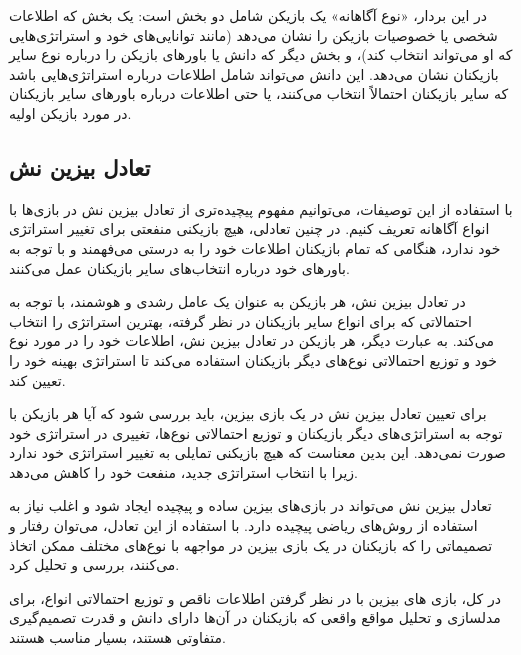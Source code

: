 در این بردار، «نوع آگاهانه» یک بازیکن شامل دو بخش است: یک بخش که اطلاعات شخصی یا خصوصیات بازیکن را نشان می‌دهد (مانند توانایی‌های خود و استراتژی‌هایی که او می‌تواند انتخاب کند)، و بخش دیگر که دانش یا باورهای بازیکن را درباره نوع سایر بازیکنان نشان می‌دهد. این دانش می‌تواند شامل اطلاعات درباره استراتژی‌هایی باشد که سایر بازیکنان احتمالاً انتخاب می‌کنند، یا حتی اطلاعات درباره باورهای سایر بازیکنان در مورد بازیکن اولیه.

\subsection*{تعادل بیزین نش}

با استفاده از این توصیفات، می‌توانیم مفهوم پیچیده‌تری از تعادل بیزین نش در بازی‌ها با انواع آگاهانه تعریف کنیم. در چنین تعادلی، هیچ بازیکنی منفعتی برای تغییر استراتژی خود ندارد، هنگامی که تمام بازیکنان اطلاعات خود را به درستی می‌فهمند و با توجه به باورهای خود درباره انتخاب‌های سایر بازیکنان عمل می‌کنند.


در تعادل بیزین نش، هر بازیکن به عنوان یک عامل رشدی و هوشمند، با توجه به احتمالاتی که برای انواع سایر بازیکنان در نظر گرفته، بهترین استراتژی را انتخاب می‌کند. به عبارت دیگر، هر بازیکن در تعادل بیزین نش، اطلاعات خود را در مورد نوع خود و توزیع احتمالاتی نوع‌های دیگر بازیکنان استفاده می‌کند تا استراتژی بهینه خود را تعیین کند.


برای تعیین تعادل بیزین نش در یک بازی بیزین، باید بررسی شود که آیا هر بازیکن با توجه به استراتژی‌های دیگر بازیکنان و توزیع احتمالاتی نوع‌ها، تغییری در استراتژی خود صورت نمی‌دهد. این بدین معناست که هیچ بازیکنی تمایلی به تغییر استراتژی خود ندارد زیرا با انتخاب استراتژی جدید، منفعت خود را کاهش می‌دهد.


تعادل بیزین نش می‌تواند در بازی‌های بیزین ساده و پیچیده ایجاد شود و اغلب نیاز به استفاده از روش‌های ریاضی پیچیده دارد. با استفاده از این تعادل، می‌توان رفتار و تصمیماتی را که بازیکنان در یک بازی بیزین در مواجهه با نوع‌های مختلف ممکن اتخاذ می‌کنند، بررسی و تحلیل کرد.


در کل، بازی های بیزین با در نظر گرفتن اطلاعات ناقص و توزیع احتمالاتی انواع، برای مدلسازی و تحلیل مواقع واقعی که بازیکنان در آن‌ها دارای دانش و قدرت تصمیم‌گیری متفاوتی هستند، بسیار مناسب هستند.





